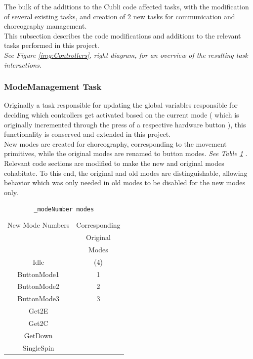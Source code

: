 The bulk of the additions to the Cubli code affected tasks, with the modification of several existing tasks, and creation of 2 new tasks for communication and choreography management.\\

This subsection describes the code modifications and additions to the relevant tasks performed in this project.\\

\textit{See Figure \ref{img:Controllers}, right diagram, for an overview of the resulting task interactions.}

\subsubsection{ModeManagement Task}

Originally a task responsible for updating the global variables responsible for deciding which controllers get activated based on the current mode ( which is originally incremented through the press of a respective hardware button ), this functionality is conserved and extended in this project.\\

New modes are created for choreography, corresponding to the movement primitives, while the original modes are renamed to button modes. \textit{See Table \ref{tab:modenumbers} }. Relevant code sections are modified to make the new and original modes cohabitate. To this end, the original and old modes are distinguishable, allowing behavior which was only needed in old modes to be disabled for the new modes only.\\

\begin{table}[H]
\begin{center}
\caption{\texttt{\_modeNumber modes}}\vspace{1ex}
\label{tab:modenumbers}
\begin{tabular}{cc}\hline
New Mode Numbers & Corresponding \\ 
                 & Original      \\
                 & Modes         \\ \hline 
Idle        & (4) \\
ButtonMode1 & 1 \\
ButtonMode2 & 2 \\
ButtonMode3 & 3 \\
Get2E       & \\
Get2C       & \\
GetDown     & \\
SingleSpin  & \\
 \hline
\end{tabular}
\end{center}
\end{table}

